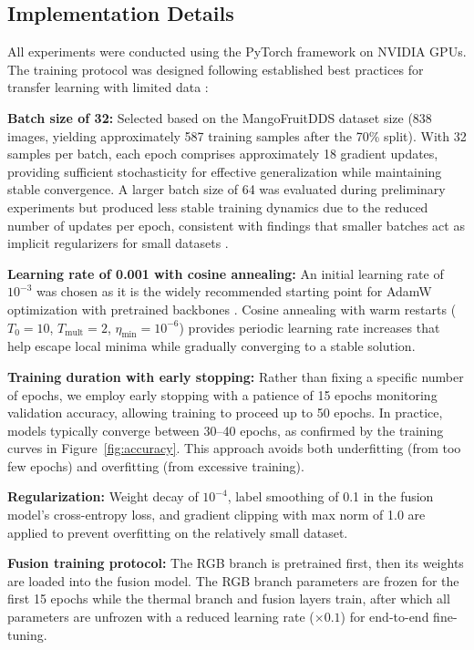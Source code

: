\documentclass[utf8]{FrontiersinHarvard}
\newenvironment{revblock}{}{}
\begin{document}
\subsection{Implementation Details}
\begin{revblock}
All experiments were conducted using the PyTorch framework \cite{paszke2019} on NVIDIA GPUs. The training protocol was designed following established best practices for transfer learning with limited data \cite{shorten2019,thakur2022}:

\textbf{Batch size of 32:} Selected based on the MangoFruitDDS dataset size (838 images, yielding approximately 587 training samples after the 70\% split). With 32 samples per batch, each epoch comprises approximately 18 gradient updates, providing sufficient stochasticity for effective generalization while maintaining stable convergence. A larger batch size of 64 was evaluated during preliminary experiments but produced less stable training dynamics due to the reduced number of updates per epoch, consistent with findings that smaller batches act as implicit regularizers for small datasets \cite{noon2020}.

\textbf{Learning rate of 0.001 with cosine annealing:} An initial learning rate of $10^{-3}$ was chosen as it is the widely recommended starting point for AdamW optimization with pretrained backbones \cite{loshchilov2019}. Cosine annealing with warm restarts ($T_0{=}10$, $T_{\text{mult}}{=}2$, $\eta_{\text{min}}{=}10^{-6}$) provides periodic learning rate increases that help escape local minima while gradually converging to a stable solution.

\textbf{Training duration with early stopping:} Rather than fixing a specific number of epochs, we employ early stopping with a patience of 15 epochs monitoring validation accuracy, allowing training to proceed up to 50 epochs. In practice, models typically converge between 30--40 epochs, as confirmed by the training curves in Figure~\ref{fig:accuracy}. This approach avoids both underfitting (from too few epochs) and overfitting (from excessive training).

\textbf{Regularization:} Weight decay of $10^{-4}$, label smoothing of 0.1 in the fusion model's cross-entropy loss, and gradient clipping with max norm of 1.0 are applied to prevent overfitting on the relatively small dataset.

\textbf{Fusion training protocol:} The RGB branch is pretrained first, then its weights are loaded into the fusion model. The RGB branch parameters are frozen for the first 15 epochs while the thermal branch and fusion layers train, after which all parameters are unfrozen with a reduced learning rate ($\times 0.1$) for end-to-end fine-tuning.
\end{revblock}
\end{document}
